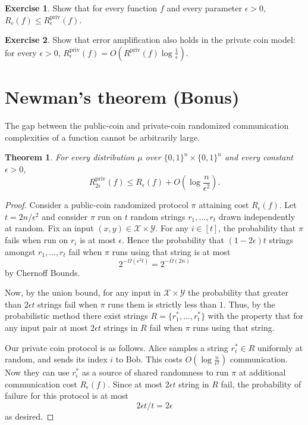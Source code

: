 \documentclass[11pt]{amsart}
\theoremstyle{plain}
\newtheorem{theorem}{Theorem}
\theoremstyle{definition}
\newtheorem{exercise}{Exercise}
\theoremstyle{plain}
\newcommand{\calX}{\mathcal{X}}
\newcommand{\calY}{\mathcal{Y}}
\newcommand{\Rpriv}{R^{\mathrm{priv}}}
\begin{document}
\begin{exercise}
Show that for every function $f$ and every parameter $\epsilon > 0$, 
$R_\epsilon(f) \le \Rpriv_\epsilon(f)$.
\end{exercise}

\begin{exercise}
Show that error amplification also holds in the private coin model: for every $\epsilon > 0$, $\Rpriv_\epsilon(f) = O(\Rpriv(f) \log \frac1\epsilon)$.
\end{exercise}


\newpage 
\section{Newman's theorem (Bonus)}

The gap between the public-coin and private-coin randomized communication complexities of a function cannot be arbitrarily large. 

\begin{theorem}
For every distribution $\mu$ over $\{0,1\}^n \times \{0,1\}^n$ and every constant $\epsilon > 0$,
\[
\Rpriv_{2\epsilon}(f) \le R_\epsilon(f) + O\left(\log \frac{n}{\epsilon^2}\right).
\]
\end{theorem}

\begin{proof}
Consider a public-coin randomized protocol $\pi$ attaining cost $R_\epsilon(f)$. Let $t = 2n/\epsilon^2$ and consider $\pi$ run on $t$ random strings $r_1, \dots, r_t$ drawn independently at random. Fix an input $(x,y) \in \calX \times \calY$. For any $i \in [t]$, the probability that $\pi$ fails when run on $r_i$ is at most $\epsilon$.
Hence the probability that $(1-2\epsilon)t$ strings amongst $r_1, \dots, r_t$ fail when $\pi$ runs using that string is at most
$$2^{-\Omega(\epsilon^2t)} = 2^{-\Omega(2n)}$$
by Chernoff Bounds. 

Now, by the union bound, for any input in $\calX\times \calY$ the probability that greater than $2\epsilon t$ strings fail when $\pi$ runs them is strictly less than $1$. Thus, by the probabilistic method there exist strings $R = \{r_1^*, \dots, r_t^*\}$ with the property that for any input pair at most $2\epsilon t$ strings in $R$ fail when $\pi$ runs using that string.

Our private coin protocol is as follows. Alice samples a string $r_i^* \in R$ uniformly at random, and sends its index $i$ to Bob. This costs $O(\log\frac{n}{\epsilon^2})$ communication. Now they can use $r_i^*$ as a source of shared randomness to run $\pi$ at additional communication cost $R_\epsilon(f)$. Since at most $2\epsilon t$ string in $R$ fail, the probability of failure for this protocol is at most
$$2\epsilon t/t = 2\epsilon$$
as desired.
\end{proof}
\end{document}
